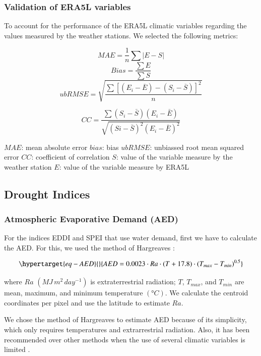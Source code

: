 \documentclass[
  authoryear,
  preprint,
  3p,
  onecolumn]{elsarticle}
\begin{document}
\hypertarget{validation-of-era5l-variables}{%
\subsubsection{Validation of ERA5L
variables}\label{validation-of-era5l-variables}}

To account for the performance of the ERA5L climatic variables regarding
the values measured by the weather stations. We selected the following
metrics:

\[MAE = \frac{1}{n}\sum |{E-S}|\] \[Bias = \frac{\sum E}{\sum S}\]
\[ubRMSE =\sqrt{\frac{\sum{ \left[ (E_i-\overline{E})-(S_i-\overline{S}) \right ] ^2}}{n}}\]

\[CC = \frac{\sum (S_i-\bar{S})(E_i-\bar{E})}{\sqrt{(Si-\bar{S})^2(E_i-\bar{E})^2}}\]

\(MAE\): mean absolute error \(bias\): bias \(ubRMSE\): unbiassed root
mean squared error \(CC\): coefficient of correlation \(S\): value of
the variable measure by the weather station \(E\): value of the variable
measure by ERA5L

\hypertarget{drought-indices}{%
\subsection{Drought Indices}\label{drought-indices}}

\hypertarget{atmospheric-evaporative-demand-aed}{%
\subsubsection{Atmospheric Evaporative Demand
(AED)}\label{atmospheric-evaporative-demand-aed}}

For the indices EDDI and SPEI that use water demand, first we have to
calculate the AED. For this, we used the method of Hargreaves
\citep{Hargreaves1994, Hargreaves1985}:

\begin{equation}\protect\hypertarget{eq-AED}{}{AED = 0.0023\cdot Ra\cdot (T+17.8)\cdot (T_{max}-T_{min})^{0.5}}\label{eq-AED}\end{equation}

where \(Ra\) \((MJ\,m^2\, day^{-1})\) is extraterrestrial radiation;
\(T\), \(T_{max}\), and \(T_{min}\) are mean, maximum, and minimum
temperature \((°C)\). We calculate the centroid coordinates per pixel
and use the latitude to estimate \(Ra\).

We chose the method of Hargreaves to estimate AED because of its
simplicity, which only requires temperatures and extrarrestrial
radiation. Also, it has been recommended over other methods when the use
of several climatic variables is limited \citep{Vicente-Serrano2014}.
\end{document}

